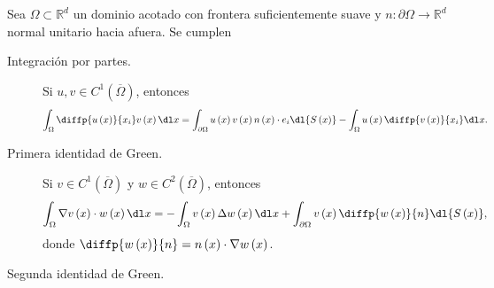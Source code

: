 \begin{theorem}
    Sea
    \begin{math}
        \Omega\subset
        \mathbb{R}^{d}
    \end{math}
    un dominio acotado con frontera suficientemente suave
    y
    \begin{math}
        n\colon
        \partial\Omega\to
        \mathbb{R}^{d}
    \end{math}
    normal unitario hacia afuera.
    Se cumplen
    \begin{description}
        \item[Integración por partes.]

              Si $u,v\in C^{1}\left(\overline{\Omega}\right)$, entonces
              \begin{equation*}
                  \int_{\Omega}\diffp{u\left(x\right)}{x_{i}}
                  v\left(x\right)\dl x=
                  \int_{\partial\Omega}
                  u\left(x\right)
                  v\left(x\right)
                  n\left(x\right)\cdot
                  e_{i}
                  \dl{S\left(x\right)}-
                  \int_{\Omega}u\left(x\right)
                  \diffp{v\left(x\right)}{x_{i}}
                  \dl x.
              \end{equation*}

        \item[Primera identidad de Green.]
              Si $v\in C^{1}\left(\overline{\Omega}\right)$ y
              $w\in C^{2}\left(\overline{\Omega}\right)$, entonces
              \begin{equation*}
                  \int_{\Omega}\nabla v\left(x\right)\cdot
                  w\left(x\right)\dl x=
                  -\int_{\Omega}
                  v\left(x\right)
                  \Delta w\left(x\right)
                  \dl x+
                  \int_{\partial\Omega}
                  v\left(x\right)
                  \diffp{w\left(x\right)}{n}
                  \dl{S\left(x\right)},
              \end{equation*}
              donde
              \begin{math}
                  \diffp{w\left(x\right)}{n}=
                  n\left(x\right)\cdot
                  \nabla w\left(x\right)
              \end{math}.

        \item[Segunda identidad de Green.]


\end{description}
\end{theorem}
